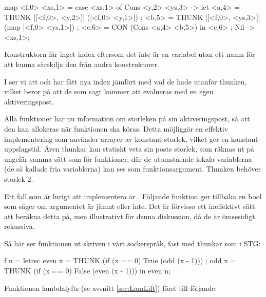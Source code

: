 \documentclass[../Core]{subfiles}
\begin{document}
\begin{codeExDiff}
map <f,0> <xs,1> = case <xs,1> of
    { Cons <y,2> <ys,3> -> let
        { <a,4> = THUNK |[<f,0>, <y,2>]|  (|<f,0> <y,1>|)
        ; <b,5> = THUNK |[<f,0>, <ys,3>]| (map |<f,0> <ys,1>|)
        ; <c,6> = CON (Cons <a,4> <b,5>)
        } in <c,6>
    ; Nil -> <xs,1>};
\end{codeExDiff}

Konstruktorn  får inget index eftersom det inte är en variabel
utan ett namn för att kunna särskilja den från andra konstruktorer. 

I  ser vi att 
 och  har fått nya index jämfört med vad de
hade utanför thunken, vilket beror på att de som sagt kommer att evalueras
med en egen aktiveringspost.

\begin{comment}
Det största värdet på variabelindex plus ett blir funktionens
aktiveringspoststorlek, vilken man alltså kan veta statiskt
(vid kompileringstid i en kompilator). Storleken för \ic{map}-funktionen blir alltså 7.
\end{comment}

Alla funktioner har nu information om storleken på sin aktiveringspost, så att 
den kan allokeras när funktionen ska köras.
Detta möjliggör en effektiv implementering som använder arrayer av konstant 
storlek, vilket ger en konstant uppslagstid.
Även thunkar kan statiskt veta sin posts storlek,
som räknas ut på ungefär samma sätt som
för funktioner, där de utomstående lokala variablerna (de så kallade fria 
variablerna) kan ses som funktionsargument.
Thunken  behöver storlek 2.

Ett fall som är lurigt att implementera är .
Följande funktion  ger tillbaka en bool som säger om 
argumentet  är jämnt eller inte. Det är förvisso ett
ineffektivt sätt att beräkna detta på, men illustrativt för denna diskussion,
då de är ömsesidigt rekursiva.

Så här ser funktionen ut skriven i vårt sockerspråk, fast med thunkar som i STG:

\begin{codeEx}
f n = letrec 
    { even x = THUNK (if (x == 0) True  (odd  (x - 1)))
    ; odd  x = THUNK (if (x == 0) False (even (x - 1)))
    } in even n;
\end{codeEx}

Funktionen lambdalyfts (se avsnitt \ref{sec:LamLift}) först till följande:
\end{document}
